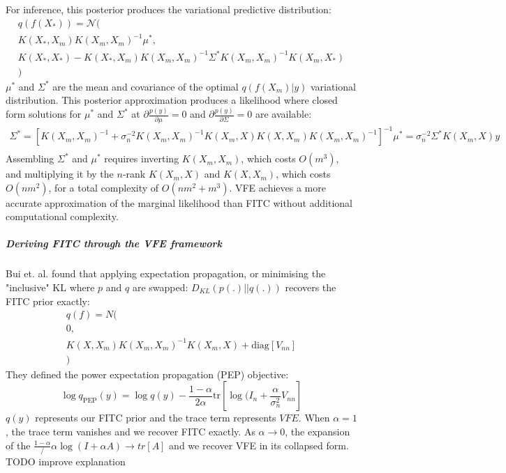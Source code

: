 For inference, this posterior produces the variational predictive distribution:
\begin{equation*}
    \begin{aligned}
        q(f(X_*)) = \mathcal{N}( \\
        K(X_*, X_m) K(X_m, X_m)^{-1} \mu^*, \\
        K(X_*, X_*) - K(X_*, X_m) K(X_m, X_m)^{-1} \Sigma^* K(X_m, X_m)^{-1} K(X_m, X_*) \\
        )
    \end{aligned}
\end{equation*}
$\mu^*$ and $\Sigma^*$ are the mean and covariance of the optimal $q(f(X_m) | y)$ variational distribution. This posterior approximation produces a likelihood where closed form solutions for $\mu^*$ and $\Sigma^*$ at $\partial \frac{p(y)}{\partial \mu} = 0$ and $\partial \frac{p(y)}{\partial \Sigma} = 0$ are available:
\begin{equation*}
    \begin{aligned}
        \Sigma^* = \left[ K(X_m, X_m)^{-1} + \sigma_n^{-2} K(X_m, X_m)^{-1} K(X_m, X) K(X, X_m) K(X_m, X_m)^{-1} \right]^{-1}
        \mu^* = \sigma_n^{-2} \Sigma^* K(X_m, X) y \\
    \end{aligned}
\end{equation*}
Assembling $\Sigma^*$ and $\mu^*$ requires inverting $K(X_m, X_m)$, which costs $O(m^3)$, and multiplying it by the $n$-rank $K(X_m, X)$ and $K(X, X_m)$, which costs $O(nm^2)$, for a total complexity of $O(nm^2 + m^3)$. VFE achieves a more accurate approximation of the marginal likelihood than FITC without additional computational complexity. 

\subparagraph{Deriving FITC through the VFE framework \cite{fitc-vfe-unifier}}
Bui et. al. \cite{fitc-vfe-unifier} found that applying expectation propagation, or minimising the "inclusive" KL where $p$ and $q$ are swapped: $D_{KL}(p(.) || q(.))$ recovers the FITC prior exactly:
\begin{equation*}
    \begin{aligned}
        q(f) = N ( \\
        0, \\
        K(X, X_m) K(X_m, X_m)^{-1} K(X_m, X) + \text{diag}[V_{nn}] \\
        )
    \end{aligned}
\end{equation*}
They defined the power expectation propagation (PEP) objective:
\begin{equation*}
    \log q_{\text{PEP}}(y) = \log q(y) - \frac{1 - \alpha}{2\alpha} \text{tr}\left[ \log(I_n + \frac{\alpha}{\sigma_n^2} V_{nn} \right]
\end{equation*}
$q(y)$ represents our FITC prior and the trace term represents $VFE$. When $\alpha = 1$, the trace term vanishes and we recover FITC exactly. As $\alpha \to 0$, the expansion of the $\frac{1-\alpha}/{\alpha} \log(I + \alpha A) \to tr[A]$ and we recover VFE in its collapsed form.  TODO improve explanation

